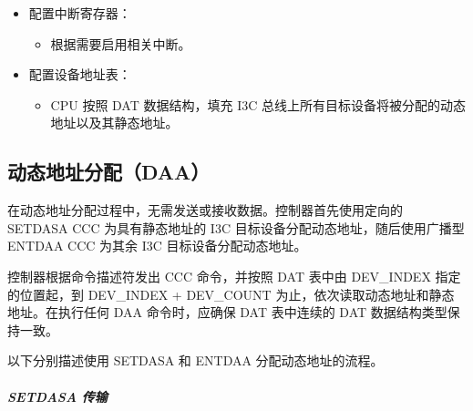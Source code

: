 \documentclass[main\_\_CN.tex]{subfiles}
\begin{document}
\begin{itemize}
        \item 配置中断寄存器：
        \begin{itemize}
            \item 根据需要启用相关中断。
        \end{itemize}
        \item 配置设备地址表：
        \begin{itemize}
            \item CPU 按照 DAT 数据结构，填充 I3C 总线上所有目标设备将被分配的动态地址以及其静态地址。
        \end{itemize}
\end{itemize}


\subsection{动态地址分配（DAA）}

在动态地址分配过程中，无需发送或接收数据。控制器首先使用定向的 SETDASA CCC 为具有静态地址的 I3C 目标设备分配动态地址，随后使用广播型 ENTDAA CCC 为其余 I3C 目标设备分配动态地址。

控制器根据命令描述符发出 CCC 命令，并按照 DAT 表中由 DEV\_INDEX 指定的位置起，到 DEV\_INDEX + DEV\_COUNT 为止，依次读取动态地址和静态地址。在执行任何 DAA 命令时，应确保 DAT 表中连续的 DAT 数据结构类型保持一致。

以下分别描述使用 SETDASA 和 ENTDAA 分配动态地址的流程。

\subparagraph{SETDASA 传输}
\end{document}

